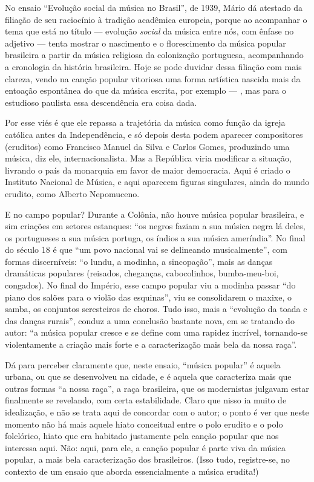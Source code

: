 No ensaio ``Evolução social da música no Brasil'', de 1939, Mário dá
atestado da filiação de seu raciocínio à tradição acadêmica europeia,
porque ao acompanhar o tema que está no título --- evolução \emph{social}
da música entre nós, com ênfase no adjetivo --- tenta mostrar o
nascimento e o florescimento da música popular brasileira a partir da
música religiosa da colonização portuguesa, acompanhando a cronologia da
história brasileira. Hoje se pode duvidar dessa filiação com mais
clareza, vendo na canção popular vitoriosa uma forma artística nascida
mais da entoação espontânea do que da música escrita, por exemplo --- ,
mas para o estudioso paulista essa descendência era coisa dada.

Por esse viés é que ele repassa a trajetória da música como função da
igreja católica antes da Independência, e só depois desta podem aparecer
compositores (eruditos) como Francisco Manuel da Silva e Carlos Gomes,
produzindo uma música, diz ele, internacionalista. Mas a República viria
modificar a situação, livrando o país da monarquia em favor de maior
democracia. Aqui é criado o Instituto Nacional de Música, e aqui
aparecem figuras singulares, ainda do mundo erudito, como Alberto
Nepomuceno.

E no campo popular? Durante a Colônia, não houve música popular
brasileira, e sim criações em setores estanques: ``os negros faziam a
sua música negra lá deles, os portugueses a sua música portuga, os
índios a sua música ameríndia''. No final do século 18 é que ``um povo
nacional vai se delineando musicalmente'', com formas discerníveis: ``o
lundu, a modinha, a sincopação'', mais as danças dramáticas populares
(reisados, cheganças, cabocolinhos, bumba-meu-boi, congados). No final
do Império, esse campo popular viu a modinha passar ``do piano dos
salões para o violão das esquinas'', viu se consolidarem o maxixe, o
samba, os conjuntos seresteiros de choros. Tudo isso, mais a ``evolução
da toada e das danças rurais'', conduz a uma conclusão bastante nova, em
se tratando do autor: ``a música popular cresce e se define com uma
rapidez incrível, tornando-se violentamente a criação mais forte e a
caracterização mais bela da nossa raça''.

Dá para perceber claramente que, neste ensaio, ``música popular'' é
aquela urbana, ou que se desenvolveu na cidade, e é aquela que
caracteriza mais que outras formas ``a nossa raça'', a raça brasileira,
que os modernistas julgavam estar finalmente se revelando, com certa
estabilidade. Claro que nisso ia muito de idealização, e não se trata
aqui de concordar com o autor; o ponto é ver que neste momento não há
mais aquele hiato conceitual entre o polo erudito e o polo folclórico,
hiato que era habitado justamente pela canção popular que nos interessa
aqui. Não: aqui, para ele, a canção popular é parte viva da música
popular, a mais bela caracterização dos brasileiros. (Isso tudo,
registre-se, no contexto de um ensaio que aborda essencialmente a música
erudita!)

